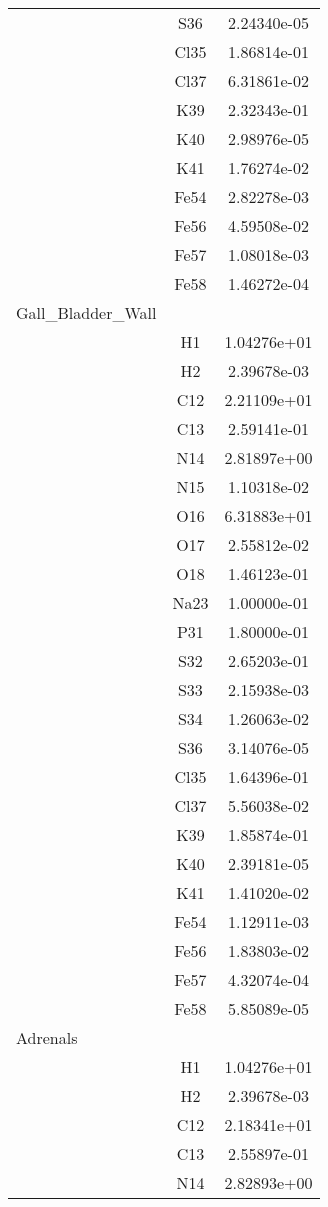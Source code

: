 \begin{centering}
\begin{longtable}{l c c}
& S36 & 2.24340e-05 \\ 
& Cl35 & 1.86814e-01 \\ 
& Cl37 & 6.31861e-02 \\ 
& K39 & 2.32343e-01 \\ 
& K40 & 2.98976e-05 \\ 
& K41 & 1.76274e-02 \\ 
& Fe54 & 2.82278e-03 \\ 
& Fe56 & 4.59508e-02 \\ 
& Fe57 & 1.08018e-03 \\ 
& Fe58 & 1.46272e-04 \\ 
\hline
Gall_Bladder_Wall & & \\
\hline
& H1 & 1.04276e+01 \\ 
& H2 & 2.39678e-03 \\ 
& C12 & 2.21109e+01 \\ 
& C13 & 2.59141e-01 \\ 
& N14 & 2.81897e+00 \\ 
& N15 & 1.10318e-02 \\ 
& O16 & 6.31883e+01 \\ 
& O17 & 2.55812e-02 \\ 
& O18 & 1.46123e-01 \\ 
& Na23 & 1.00000e-01 \\ 
& P31 & 1.80000e-01 \\ 
& S32 & 2.65203e-01 \\ 
& S33 & 2.15938e-03 \\ 
& S34 & 1.26063e-02 \\ 
& S36 & 3.14076e-05 \\ 
& Cl35 & 1.64396e-01 \\ 
& Cl37 & 5.56038e-02 \\ 
& K39 & 1.85874e-01 \\ 
& K40 & 2.39181e-05 \\ 
& K41 & 1.41020e-02 \\ 
& Fe54 & 1.12911e-03 \\ 
& Fe56 & 1.83803e-02 \\ 
& Fe57 & 4.32074e-04 \\ 
& Fe58 & 5.85089e-05 \\ 
\hline
Adrenals & & \\
\hline
& H1 & 1.04276e+01 \\ 
& H2 & 2.39678e-03 \\ 
& C12 & 2.18341e+01 \\ 
& C13 & 2.55897e-01 \\ 
& N14 & 2.82893e+00 \\ 

\end{longtable}
\end{centering}
